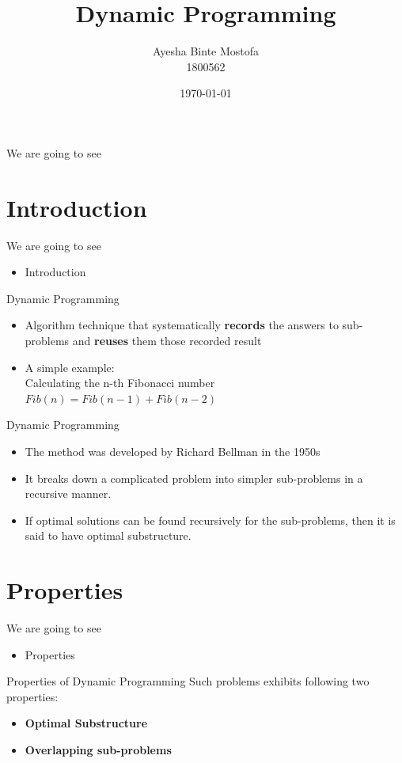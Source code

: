 \documentclass{beamer}
\title{Dynamic Programming}
\author[1805062,1805082]{Ayesha Binte Mostofa \\1800562}
\date{\today}
\begin{document}
\frame{\titlepage}

\begin{frame}{We are going to see}
    \tableofcontents
\end{frame}
\section{Introduction}
\begin{frame}{We are going to see}
    \begin{itemize}
    \item Introduction 
    \end{itemize}
\end{frame}

\begin{frame}{Dynamic Programming}
\begin{itemize}
    \item<1-> Algorithm technique that systematically \textbf{records} the answers to sub-problems and \textbf{reuses} them those recorded result
     \item A simple example: \\
     Calculating the n-th Fibonacci number\\
 $Fib(n) = Fib(n −1) + Fib(n −2)$
\end{itemize}
\end{frame}
\begin{frame}{Dynamic Programming}
\begin{itemize}
    \item<1-> The method was developed by Richard Bellman in the 1950s
     \item<2-> It breaks down a complicated problem into simpler
sub-problems in a recursive manner.
\item<3-> If optimal solutions can be found recursively for the
sub-problems, then it is said to have optimal substructure.
\end{itemize}
\end{frame}
\section{Properties}
\begin{frame}{We are going to see}
    \begin{itemize}
    \item Properties
    \end{itemize}
\end{frame}
\begin{frame}{Properties of Dynamic Programming}
Such problems exhibits following two properties:
\begin{itemize}
    \item \textbf{Optimal Substructure}
     \item \textbf{Overlapping sub-problems}
\end{itemize}
\end{frame}
\end{document}
